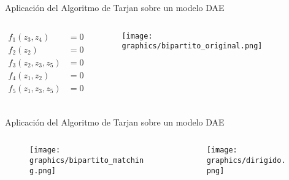 \begin{frame}[fragile]{Aplicación del Algoritmo de Tarjan sobre un modelo DAE}
    \begin{columns}
        \begin{column}{0.5\textwidth}
          \centering
          \begin{align*}
            f_1(z_3,z_4) &= 0 \\
            f_2(z_2) &= 0 \\
            f_3(z_2,z_3,z_5) &= 0 \\
            f_4(z_1,z_2) &= 0 \\
            f_5(z_1,z_3,z_5) &= 0 \\
          \end{align*}
        \end{column}
        \begin{column}{0.5\textwidth}
        \begin{figure}
           \centering
           \texttt{[image: graphics/bipartito\_original.png]}
        \end{figure}
        \end{column}
    \end{columns}
\end{frame}

\begin{frame}[fragile]{Aplicación del Algoritmo de Tarjan sobre un modelo DAE}
    \begin{columns}
        \begin{column}{0.5\textwidth}
        \begin{figure}
           \centering
           \texttt{[image: graphics/bipartito\_matching.png]}
        \end{figure}
        \end{column}
        \begin{column}{0.5\textwidth}
        \begin{figure}
           \centering
           \texttt{[image: graphics/dirigido.png]}
        \end{figure}
        \end{column}
    \end{columns}
\end{frame}

